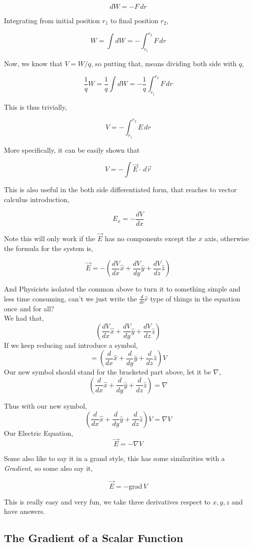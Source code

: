 \documentclass[11pt,a4paper,landscape,twocolumn]{article}
\theoremstyle{definition}
\theoremstyle{definition}
\theoremstyle{definition}
\theoremstyle{definition}
\begin{document}
\[ dW = - F \, dr \]

Integrating from initial position $r_1$ to final position $r_2$, 

\[ W = \int dW = -\int_{r_1}^{r_2} F \, dr \]

Now, we know that $ V = W/q $, so putting that, means dividing both side with $q$, 

\[ \frac{1}{q} W = \frac{1}{q} \int dW = -\frac{1}{q} \int_{r_1}^{r_2} F \, dr \]

This is thus trivially, 

\[ V = -  \int_{r_1}^{r_2} E \, dr \]

More specifically, it can be easily shown that 

\[ V = - \int \vec{E} \cdot \, d\vec{r} \]

This is also useful in the both side differentiated form, that reaches to vector calculus introduction,

\[ E_x = - \frac{dV}{dx} \]

Note this will only work if the $\vec{E}$ has no components except the $x$ axis, otherwise the formula for the system is,

\[ \vec{E} = - \left(	\frac{dV}{dx} \hat{x} + \frac{dV}{dy} \hat{y} + \frac{dV}{dz} \hat{z}\right)  \]

And Physicists isolated the common above to turn it to something simple and less time consuming, can't we just write the $\frac{d}{dr} \hat{r} $ type of things in the equation once and for all? \\
We had that,
\[ \left(	\frac{dV}{dx} \hat{x} + \frac{dV}{dy} \hat{y} + \frac{dV}{dz} \hat{z}\right)  \]
If we keep reducing and introduce a symbol,
 \[ = \left(	\frac{d}{dx} \hat{x} + \frac{d}{dy} \hat{y} + \frac{d}{dz} \hat{z} \right) V \]
 Our new symbol should stand for the bracketed part above, let it be $\nabla$,
 \[ \left(	\frac{d}{dx} \hat{x}+ \frac{d}{dy} \hat{y} + \frac{d}{dz} \hat{z} \right) = \nabla \]
 
 Thus with our new symbol, 
 \[ \left(	\frac{d}{dx} \hat{x} + \frac{d}{dy} \hat{y} + \frac{d}{dz} \hat{z} \right) V = \nabla V \]
 Our Electric Equation, 
\[ \vec{E} = - \nabla V \]

Some also like to say it in a grand style, this has some similarities with a \emph{Gradient}, so some also say it, 

\[ \vec{E} = - \mathrm{grad} \, V \]
 
 This is really easy and very fun, we take three derivatives respect to $x,y,z$ and have answers.
\subsection{\small{The Gradient of a Scalar Function}}
\end{document}
